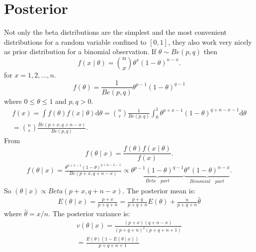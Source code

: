 \documentclass[lecture,12pt,]{pcms-l}
\numberwithin{section}{chapter}
\numberwithin{equation}{chapter}
\theoremstyle{plain}
\theoremstyle{definition}
\theoremstyle{definition}
\begin{document}
\section{Posterior}
Not only the beta distributions are the simplest and the most convenient distributions for a random variable confined to $[0,1]$, they also work very nicely as prior distribution for a binomial observation. If $\theta \sim Be(p,q)$ then
\begin{equation}
f(x \mid \theta)=\binom{n}{x}\theta^x (1-\theta)^{n-x}.
\end{equation}
for $x=1,2,...,n$.
\begin{equation}
f(\theta)=\frac{1}{Be(p,q)}\theta^{p-1}(1-\theta)^{q-1}
\end{equation}
where $0\leq \theta \leq 1$ and $p,q>0$.
\begin{equation}
\begin{split}
f(x)=\int f(\theta)f(x \mid \theta)\mathrm{d}\theta=\binom{n}{r}\frac{1}{Be(p,q)}\int_{0}^{1}\theta^{p+x-1}(1-\theta)^{q+n-x-1}\mathrm{d}\theta
\\
=\binom{n}{r}\frac{Be(p+x,q+n-x)}{Be(p,q)}.
\end{split}
\end{equation}
From
\begin{equation}
f(\theta \mid x)=\frac{f(\theta)f(x \mid \theta)}{f(x)}.
\end{equation}
\begin{equation}
\begin{split}
f(\theta \mid x)=\frac{\theta^{p+x-1}(1-\theta)^{q+n-x-1}}{Be(p+x,q+n-x)}
\propto \underbrace{\theta^{p-1}(1-\theta)^{q-1}}_{Beta \quad part} \underbrace{\theta^{x}(1-\theta)^{n-x}}_{Binomial \quad part}. 
\end{split}
\end{equation}
So $(\theta \mid x)\propto Beta(p+x,q+n-x)$. The posterior mean is:
\begin{equation}
\begin{split}
E(\theta \mid x)= \frac{p+x}{p+q+n}=\frac{p+q}{p+q+n}E(\theta)+\frac{n}{p+q+n}\hat{\theta}
\end{split}
\end{equation}
where $\hat{\theta}=x/n$. The posterior variance is:
\begin{equation}
\begin{split}
v(\theta \mid x)=\frac{(p+x)(q+n-x)}{(p+q+n)^2 (p+q+n+1)}
\\
=\frac{E(\theta)(1-E(\theta \mid x))}{ p+q+n+1}
\end{split}
\end{equation}
\end{document}
